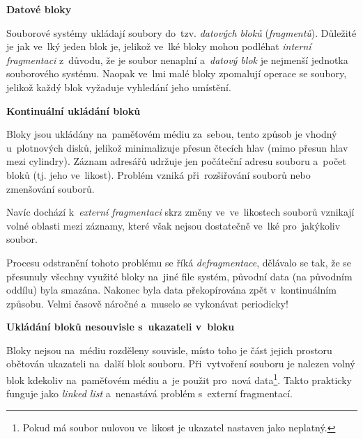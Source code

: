 \begin{Large}
	\vspace{0,5cm}
	\textbf{Datové bloky}
\end{Large}

Souborové systémy ukládají soubory do~tzv. \emph{datových bloků} (\emph{fragmentů}). Důležité je jak ve~lký jeden blok je, jelikož ve~lké bloky mohou podléhat \emph{interní fragmentaci} z~důvodu, že je soubor nenaplní a~\emph{datový blok} je nejmenší jednotka souborového systému. Naopak ve~lmi malé bloky zpomalují operace se soubory, jelikož každý blok vyžaduje vyhledání jeho umístění. 

\begin{large}
	\vspace{0,5cm}
	\textbf{Kontinuální ukládání bloků}
\end{large}

Bloky jsou ukládány na~paměťovém médiu za~sebou, tento způsob je vhodný u~plotnových disků, jelikož minimalizuje přesun čtecích hlav (mimo přesun hlav mezi cylindry). Záznam adresářů udržuje jen počáteční adresu souboru a~počet bloků (tj. jeho ve~likost). Problém vzniká při~rozšiřování souborů nebo zmenšování souborů. 

\vspace{0,5cm}

Navíc dochází k~\emph{externí fragmentaci} skrz změny ve~ve~likostech souborů vznikají volné oblasti mezi záznamy, 
které však nejsou dostatečně ve~lké pro~jakýkoliv soubor. 

\clearpage

Procesu odstranění tohoto problému se říká \emph{defragmentace}, dělávalo se tak, že se přesunuly všechny využité bloky na~jiné file systém, původní data (na původním oddílu) byla smazána. Nakonec byla data překopírována zpět v~kontinuálním způsobu. Velmi časově náročné a~muselo se vykonávat periodicky! 

\begin{large}
	\vspace{0,5cm}
	\textbf{Ukládání bloků nesouvisle s~ukazateli v~bloku}
\end{large}

Bloky nejsou na~médiu rozděleny souvisle, místo toho je část jejich prostoru obětován ukazateli na~další blok souboru. Při~vytvoření souboru je nalezen volný blok kdekoliv na~paměťovém médiu a~je použit pro~nová data\footnote{Pokud má soubor nulovou ve~likost je ukazatel nastaven jako neplatný.}. Takto prakticky funguje jako \emph{linked list} a~nenastává problém s~externí fragmentací. 

